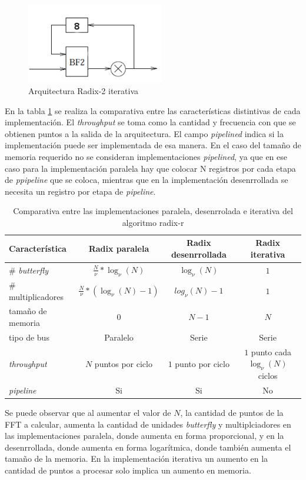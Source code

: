 \begin{figure}[htb!]
        \centering
        \includegraphics[width=6cm]{./figures/r2sBf.png}
        \caption{Arquitectura Radix-2 iterativa}
        \label{fig:r2sBf}
\end{figure}

En la tabla \ref{table:radixcomp} se realiza la comparativa entre las características distintivas de
cada implementación. El \textit{throughput} se toma como la cantidad y frecuencia con que se
obtienen puntos a la salida de la arquitectura. El campo \textit{pipelined} indica si la
implementación puede ser implementada de esa manera. En el caso del tamaño de memoria requerido no
se consideran implementaciones \textit{pipelined}, ya que en ese caso para la implementación
paralela hay que colocar N registros por cada etapa de \textit{ppipeline} que se coloca, mientras
que en la implementación desenrrollada se necesita un registro por etapa de \textit{pipeline}.

\begin{table}[htb!]
\centering
\begin{tabular}{l c c c}
\textbf{Característica} & \textbf{Radix paralela} & \textbf{Radix desenrrollada} &
\textbf{Radix iterativa}\\
\hline 
\# \textit{butterfly} & $\frac{N}{\nu}*\log_\nu(N)$ & $\log_\nu(N)$ & $1$ \\
\# multiplicadores & $\frac{N}{\nu}*(\log_\nu(N)-1)$ & $log_\nu(N)-1$ & $1$ \\
tamaño de memoria & $0$ & $N-1$ & $N$ \\
tipo de bus & Paralelo & Serie & Serie \\
\textit{throughput} & $N$ puntos por ciclo & $1$ punto por ciclo & $1$ punto cada $\log_\nu(N)$
ciclos\\
\textit{pipeline} & Si & Si & No\\
\hline
\end{tabular}
\caption{Comparativa entre las implementaciones paralela, desenrrolada e iterativa del algoritmo
radix-r}
\label{table:radixcomp}
\end{table}

Se puede observar que al aumentar el valor de $N$, la cantidad de puntos de la FFT a calcular,
aumenta la cantidad de unidades \textit{butterfly} y multiplciadores en las implementaciones
paralela, donde aumenta en forma proporcional, y en la desenrrollada, donde aumenta en forma
logarítmica, donde también aumenta el tamaño de la memoria. En la implementación iterativa un
aumento en la cantidad de puntos a procesar solo implica un aumento en memoria.

